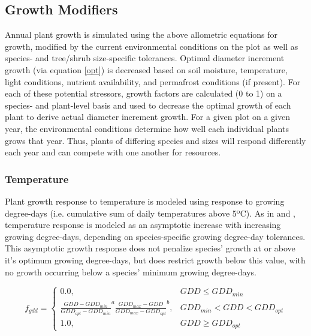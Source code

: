\documentclass[a4paper, 12pt] {report}
\begin{document}
\subsection{Growth Modifiers} \label{gmult}

Annual plant growth is simulated using the above allometric equations for growth, modified by the current environmental conditions on the plot as well as species- and tree/shrub size-specific tolerances. Optimal diameter increment growth (via equation \ref{opt}) is decreased based on soil moisture, temperature, light conditions, nutrient availability, and permafrost conditions (if present). For each of these potential stressors, growth factors are calculated (0 to 1) on a species- and plant-level basis and used to decrease the optimal growth of each plant to derive actual diameter increment growth. For a given plot on a given year, the environmental conditions determine how well each individual plants grows that year. Thus, plants of differing species and sizes will respond differently each year and can compete with one another for resources.

\subsubsection{Temperature}

Plant growth response to temperature is modeled using response to growing degree-days (i.e. cumulative sum of daily temperatures above 5ºC). As in  and , temperature response is modeled as an asymptotic increase with increasing growing degree-days, depending on species-specific growing degree-day tolerances. This asymptotic growth response does not penalize species' growth at or above it's optimum growing degree-days, but does restrict growth below this value, with no growth occurring below a species' minimum growing degree-days.

\begin{equation} \label{tempF}
f_{gdd} = 
\begin{cases}
0.0, & \text{$GDD \leq GDD_{min}$}\\
{\frac{GDD - GDD_{min}}{GDD_{opt} - GDD_{min}}^a}{\frac{GDD_{max} - GDD}{GDD_{max} - GDD_{opt}}}^b, & \text{$GDD_{min} < GDD < GDD_{opt}$}\\
1.0, & \text{$GDD \geq GDD_{opt}$}
\end{cases}
\end{equation}
\end{document}

